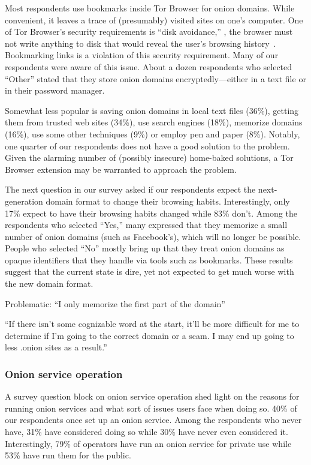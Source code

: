 Most respondents use bookmarks inside Tor Browser for onion domains.  While
convenient, it leaves a trace of (presumably) visited sites on one's computer.
One of Tor Browser's security requirements is ``disk avoidance,'' \ie, the
browser must not write anything to disk that would reveal the user's browsing
history~\cite[\S~2.1]{Perry2017a}.  Bookmarking links is a violation of this
security requirement.  Many of our respondents were aware of this issue.  About
a dozen respondents who selected ``Other'' stated that they store onion domains
encryptedly---either in a text file or in their password manager.

Somewhat less popular is saving onion domains in local text files (36\%),
getting them from trusted web sites (34\%), use search engines (18\%), memorize
domains (16\%), use some other techniques (9\%) or employ pen and paper (8\%).
Notably, one quarter of our respondents does not have a good solution to the
problem.  Given the alarming number of (possibly insecure) home-baked solutions,
a Tor Browser extension may be warranted to approach the problem.

The next question in our survey asked if our respondents expect the
next-generation domain format to change their browsing habits.  Interestingly,
only 17\% expect to have their browsing habits changed while 83\% don't.  Among
the respondents who selected ``Yes,'' many expressed that they memorize a small
number of onion domains (such as Facebook's), which will no longer be possible.
People who selected ``No'' mostly bring up that they treat onion domains as
opaque identifiers that they handle via tools such as bookmarks.  These results
suggest that the current state is dire, yet not expected to get much worse with
the new domain format.

Problematic:
``I only memorize the first part of the domain''

``If there isn't some cognizable word at the start, it'll be more difficult for
me to determine if I'm going to the correct domain or a scam. I may end up going
to less .onion sites as a result.''

\subsubsection{Onion service operation}

A survey question block on onion service operation shed light on the reasons for
running onion services and what sort of issues users face when doing so.  40\%
of our respondents once set up an onion service.  Among the respondents who
never have, 31\% have considered doing so while 30\% have never even considered
it.  Interestingly, 79\% of operators have run an onion service for private use
while 53\% have run them for the public.

